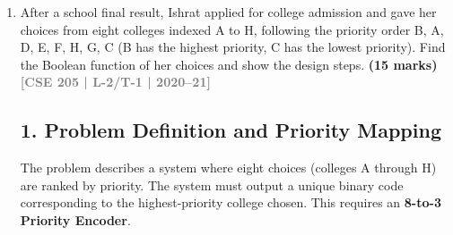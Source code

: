 \documentclass[12pt,a3paper]{article}
\newcommand{\yr}[1]{\hfill\textcolor{gray}{\small\textbf{[#1]}}}
\newcommand{\mk}[1]{\textcolor{orange!70!black}{\small\textbf{(#1 marks)}}}
\begin{document}
\begin{enumerate}
\begin{tcolorbox}[enhanced,breakable,ansbox,colback=cD!4,colframe=cD,boxrule=0.8pt,arc=5pt,title={\textbf{Answer}},fonttitle=\bfseries\color{white},colbacktitle=cD]
\subsection*{3. Boolean Output Equations (For Reference)}
Although not strictly asked, defining the Boolean equations based on the truth table demonstrates a complete understanding of the circuit's underlying logic. The outputs are only valid when $V=1$.
\begin{align*}
    V   &= D_0 + D_1 + D_2 + D_3 + D_4 + D_5 + D_6 + D_7 \\
    A_2 &= \overline{D_0} \cdot \overline{D_1} \cdot \overline{D_2} \cdot \overline{D_3} \cdot (D_4 + D_5 + D_6 + D_7) \\
    A_1 &= \overline{D_0} \cdot \overline{D_1} \cdot (D_2 + D_3) + \overline{D_0} \cdot \overline{D_1} \cdot \overline{D_2} \cdot \overline{D_3} \cdot \overline{D_4} \cdot \overline{D_5} \cdot (D_6 + D_7) \\
    A_0 &= \overline{D_0} \cdot D_1 + \overline{D_0} \cdot \overline{D_1} \cdot \overline{D_2} \cdot D_3 + \overline{D_0} \cdot \overline{D_1} \cdot \overline{D_2} \cdot \overline{D_3} \cdot \overline{D_4} \cdot D_5 + \overline{D_0} \cdot \overline{D_1} \cdot \overline{D_2} \cdot \overline{D_3} \cdot \overline{D_4} \cdot \overline{D_5} \cdot \overline{D_6} \cdot D_7
\end{align*}

\end{tcolorbox}

\item After a school final result, Ishrat applied for college admission and gave her choices from eight colleges indexed A to H, following the priority order B, A, D, E, F, H, G, C (B has the highest priority, C has the lowest priority). Find the Boolean function of her choices and show the design steps.
\mk{15} \yr{CSE 205 | L-2/T-1 | 2020--21}

\begin{tcolorbox}[enhanced,breakable,ansbox,colback=cD!4,colframe=cD,boxrule=0.8pt,arc=5pt,title={\textbf{Answer}},fonttitle=\bfseries\color{white},colbacktitle=cD]

\subsection*{1. Problem Definition and Priority Mapping}

The problem describes a system where eight choices (colleges A through H) are ranked by priority. The system must output a unique binary code corresponding to the highest-priority college chosen. This requires an \textbf{8-to-3 Priority Encoder}. 


\end{tcolorbox}
\end{enumerate}
\end{document}
